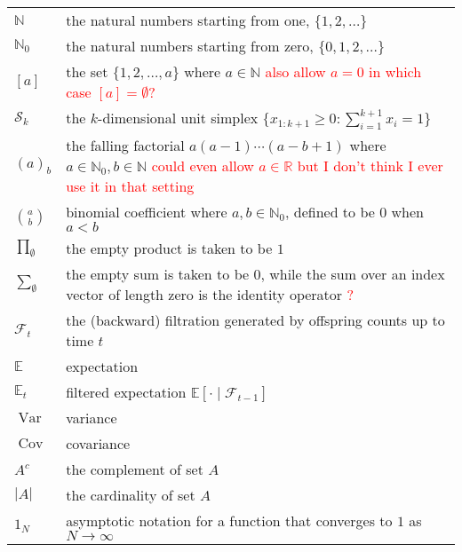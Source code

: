 \documentclass[oneside]{scrbook} %
\newcommand{\seb}[1]{\xspace\textcolor{red}{#1}\xspace} %
\theoremstyle{definition}
\newcommand{\E}{\mathbb{E}}
\newcommand{\Et}{\mathbb{E}_t}
\newcommand{\V}{\operatorname{Var}}
\newcommand{\Cov}{\operatorname{Cov}}
\newcommand{\1}[1]{\mathbbm{1}_{#1}} %
\begin{document}
\begin{tabular}{p{} p{}}
$\mathbb{N}$ & the natural numbers starting from one, $\{1,2,\dots \}$ \\
$\mathbb{N}_0$ & the natural numbers starting from zero, $\{0,1,2,\dots \}$ \\
$[a]$ & the set $\{1,2,\dots,a\}$ where $a\in\mathbb{N}$ \seb{also allow $a=0$ in which case $[a] = \emptyset$?} \\
$\mathcal{S}_k$ & the $k$-dimensional unit simplex $\{ x_{1:k+1} \geq 0 : \sum_{i=1}^{k+1} x_i = 1 \}$ \\
$(a)_b$ & the falling factorial $a (a-1) \cdots (a-b+1)$ 
    where $a \in \mathbb{N}_0, b \in \mathbb{N}$ \seb{could even allow $a\in\mathbb{R}$ but I don't think I ever use it in that setting} \\
$\binom{a}{b}$ & binomial coefficient where $a,b \in \mathbb{N}_0$, defined to be $0$ when $a<b$ \\
$\prod_{\emptyset}$ & the empty product is taken to be $1$ \\
$\sum_{\emptyset}$ & the empty sum is taken to be $0$, while the sum over
    an index vector of length zero is the identity operator \seb{?} \\
$\mathcal{F}_{t}$ & the (backward) filtration generated by offspring counts 
    up to time $t$ \\
$\E$ & expectation \\
$\Et$ & filtered expectation $\E[ \cdot \mid \mathcal{F}_{t-1}]$\\
$\V$ & variance \\
$\Cov$ & covariance \\
$A^c$ & the complement of set $A$\\
$|A|$ & the cardinality of set $A$\\
$1_N$ & asymptotic notation for a function that converges to $1$ as $N\to\infty$ \\
\end{tabular}


\mainmatter











\backmatter


\printbibliography
\end{document}
